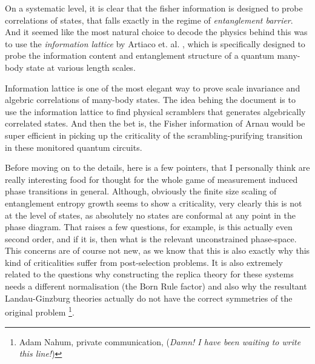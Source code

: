 On a systematic level, it is clear that the fisher information is designed to probe correlations of states, that falls exactly in the regime of \textit{entanglement barrier}. And it seemed like the most natural choice to decode the physics behind this was to use the \textit{information lattice} by Artiaco et. al. \cite{Artiaco2024EfficientLargePRXQuantum}, which is specifically designed to probe the information content and entanglement structure of a quantum many-body state at various length scales. 


Information lattice is one of the most elegant way to prove scale invariance and algebric correlations of many-body states. The idea behing the document is to use the information lattice to find physical scramblers that generates algebrically correlated states. And then the bet is, the Fisher information of Arnau would be super efficient in picking up the criticality of the scrambling-purifying transition in these monitored quantum circuits.


\begin{notes}
Before moving on to the details, here is a few pointers, that I personally think are really interesting food for thought for the whole game of measurement induced phase transitions in general. Although, obviously the finite size scaling of entanglement entropy growth seems to show a criticality, very clearly this is not at the level of states, as absolutely no states are conformal at any point in the phase diagram. That raises a few questions, for example, is this actually even second order, and if it is, then what is the relevant unconstrained phase-space. This concerns are of course not new, as we know that this is also exactly why this kind of criticalities suffer from post-selection problems. It is also extremely related to the questions why constructing the replica theory for these systems needs a different normalisation (the Born Rule factor) and also why the resultant Landau-Ginzburg theories \cite{Adam2021MeasurementEntanglementPRXQuantumTheTheoryOfEverythingPaper} actually do not have the correct symmetries of the original problem \footnote{ Adam Nahum, private communication, (\textit{Damn! I have been waiting to write this line!})}.
\end{notes}